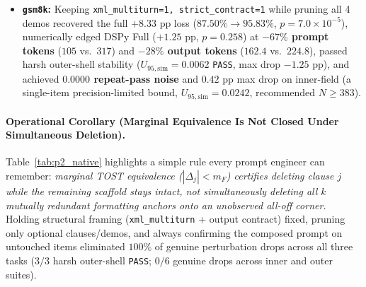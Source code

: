 \documentclass[11pt,a4paper]{article}
\begin{document}
\begin{enumerate}[leftmargin=*,nosep]
\begin{itemize}[leftmargin=*,nosep]
        \item \textbf{\texttt{gsm8k}:} Keeping \texttt{xml\_multiturn=1, strict\_contract=1} while pruning all 4 demos recovered the full \textbf{$+8.33\text{ pp}$} loss ($87.50\% \to 95.83\%$, $p=7.0\times 10^{-5}$), numerically edged DSPy Full ($+1.25\text{ pp}$, $p=0.258$) at \textbf{$-67\%$ prompt tokens} ($105$ vs.\ $317$) and \textbf{$-28\%$ output tokens} ($162.4$ vs.\ $224.8$), passed harsh outer-shell stability ($U_{95,\mathrm{sim}}=0.0062$ \texttt{PASS}, max drop $-1.25\text{ pp}$), and achieved \textbf{$0.0000$ repeat-pass noise} and $0.42\text{ pp}$ max drop on inner-field (a single-item precision-limited bound, $U_{95,\mathrm{sim}}=0.0242$, recommended $N \ge 383$).
    \end{itemize}
\end{enumerate}

\paragraph{Operational Corollary (Marginal Equivalence Is Not Closed Under Simultaneous Deletion).}
Table~\ref{tab:p2_native} highlights a simple rule every prompt engineer can remember: \emph{marginal TOST equivalence ($|\Delta_j| < m_F$) certifies deleting clause $j$ while the remaining scaffold stays intact, not simultaneously deleting all $k$ mutually redundant formatting anchors onto an unobserved all-off corner.} Holding structural framing (\texttt{xml\_multiturn} + output contract) fixed, pruning only optional clauses/demos, and always confirming the composed prompt on untouched items eliminated $100\%$ of genuine perturbation drops across all three tasks ($3/3$ harsh outer-shell \texttt{PASS}; $0/6$ genuine drops across inner and outer suites).
\end{document}
